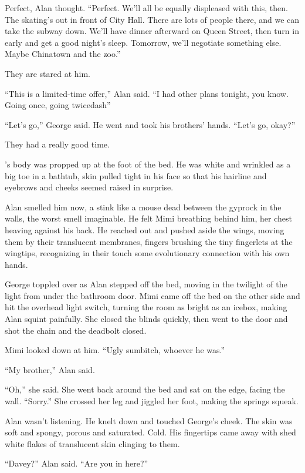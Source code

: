 Perfect, Alan thought.  ``Perfect.  We'll all be equally displeased
with this, then.  The skating's out in front of City Hall.  There are
lots of people there, and we can take the subway down.  We'll have
dinner afterward on Queen Street, then turn in early and get a good
night's sleep.  Tomorrow, we'll negotiate something else.  Maybe
Chinatown and the zoo.''

They are stared at him.

``This is a limited-time offer,'' Alan said.  ``I had other plans
tonight, you know.  Going once, going twicedash{}''

``Let's go,'' George said.  He went and took his brothers' hands. 
``Let's go, okay?''

They had a really good time.

's body was propped up at the foot of the bed.  He was white and
wrinkled as a big toe in a bathtub, skin pulled tight in his face so
that his hairline and eyebrows and cheeks seemed raised in surprise.

Alan smelled him now, a stink like a mouse dead between the gyprock in
the walls, the worst smell imaginable.  He felt Mimi breathing behind
him, her chest heaving against his back.  He reached out and pushed
aside the wings, moving them by their translucent membranes, fingers
brushing the tiny fingerlets at the wingtips, recognizing in their
touch some evolutionary connection with his own hands.

George toppled over as Alan stepped off the bed, moving in the
twilight of the light from under the bathroom door.  Mimi came off the
bed on the other side and hit the overhead light switch, turning the
room as bright as an icebox, making Alan squint painfully.  She closed
the blinds quickly, then went to the door and shot the chain and the
deadbolt closed.

Mimi looked down at him.  ``Ugly sumbitch, whoever he was.''

``My brother,'' Alan said.

``Oh,'' she said.  She went back around the bed and sat on the edge,
facing the wall.  ``Sorry.'' She crossed her leg and jiggled her foot,
making the springs squeak.

Alan wasn't listening.  He knelt down and touched George's cheek.  The
skin was soft and spongy, porous and saturated.  Cold.  His fingertips
came away with shed white flakes of translucent skin clinging to them.

``Davey?'' Alan said.  ``Are you in here?''

